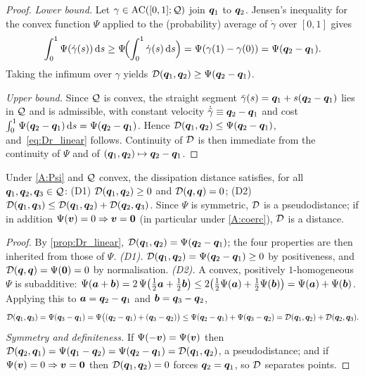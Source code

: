 \begin{proof}
\emph{Lower bound.} Let $\gamma\in\mathrm{AC}([0,1];\mathcal{Q})$ join
$\bm{q}_1$ to $\bm{q}_2$. Jensen's inequality for the convex function
$\Psi$ applied to the (probability) average of $\dot\gamma$ over
$[0,1]$ gives
\[
  \int_0^1\Psi(\dot\gamma(s))\mathop{}\!\mathrm{d} s
  \ge\Psi\!\Bigl(\int_0^1\dot\gamma(s)\mathop{}\!\mathrm{d} s\Bigr)
  =\Psi(\gamma(1)-\gamma(0))=\Psi(\bm{q}_2-\bm{q}_1).
\]
Taking the infimum over $\gamma$ yields
$\mathcal{D}(\bm{q}_1,\bm{q}_2)\ge\Psi(\bm{q}_2-\bm{q}_1)$.

\emph{Upper bound.} Since $\mathcal{Q}$ is convex, the straight segment
$\bar\gamma(s)=\bm{q}_1+s(\bm{q}_2-\bm{q}_1)$ lies in $\mathcal{Q}$ and is
admissible, with constant velocity $\dot{\bar\gamma}\equiv\bm{q}_2-\bm{q}_1$
and cost $\int_0^1\Psi(\bm{q}_2-\bm{q}_1)\mathop{}\!\mathrm{d} s=\Psi(\bm{q}_2-\bm{q}_1)$.
Hence $\mathcal{D}(\bm{q}_1,\bm{q}_2)\le\Psi(\bm{q}_2-\bm{q}_1)$, and~\eqref{eq:Dr_linear}
follows. Continuity of $\mathcal{D}$ is then immediate from the continuity of
$\Psi$ and of $(\bm{q}_1,\bm{q}_2)\mapsto\bm{q}_2-\bm{q}_1$.
\end{proof}

\begin{proposition}\label{prop:quasi_distance}
Under \ref{A:Psi} and $\mathcal{Q}$ convex, the dissipation distance satisfies,
for all $\bm{q}_1,\bm{q}_2,\bm{q}_3\in\mathcal{Q}$:
\textnormal{(D1)} $\mathcal{D}(\bm{q}_1,\bm{q}_2)\ge0$ and $\mathcal{D}(\bm{q},\bm{q})=0$;
\textnormal{(D2)} $\mathcal{D}(\bm{q}_1,\bm{q}_3)\le\mathcal{D}(\bm{q}_1,\bm{q}_2)+\mathcal{D}(\bm{q}_2,\bm{q}_3)$.
Since $\Psi$ is symmetric, $\mathcal{D}$ is a pseudodistance; if in addition
$\Psi(\bm{v})=0\Rightarrow\bm{v}=\bm{0}$ (in particular under
\ref{A:coerc}), $\mathcal{D}$ is a distance.
\end{proposition}

\begin{proof}
By \cref{prop:Dr_linear}, $\mathcal{D}(\bm{q}_1,\bm{q}_2)=\Psi(\bm{q}_2-\bm{q}_1)$;
the four properties are then inherited from those of $\Psi$.
\emph{(D1).} $\mathcal{D}(\bm{q}_1,\bm{q}_2)=\Psi(\bm{q}_2-\bm{q}_1)\ge0$ by
positiveness, and $\mathcal{D}(\bm{q},\bm{q})=\Psi(\bm{0})=0$ by normalisation.
\emph{(D2).} A convex, positively $1$-homogeneous $\Psi$ is subadditive:
$\Psi(\bm{a}+\bm{b})=2\,\Psi\bigl(\tfrac12\bm{a}+\tfrac12\bm{b}\bigr)
\le2\bigl(\tfrac12\Psi(\bm{a})+\tfrac12\Psi(\bm{b})\bigr)=\Psi(\bm{a})+\Psi(\bm{b})$.
Applying this to $\bm{a}=\bm{q}_2-\bm{q}_1$ and $\bm{b}=\bm{q}_3-\bm{q}_2$,
\[
  \mathcal{D}(\bm{q}_1,\bm{q}_3)=\Psi(\bm{q}_3-\bm{q}_1)
  =\Psi\bigl((\bm{q}_2-\bm{q}_1)+(\bm{q}_3-\bm{q}_2)\bigr)
  \le\Psi(\bm{q}_2-\bm{q}_1)+\Psi(\bm{q}_3-\bm{q}_2)
  =\mathcal{D}(\bm{q}_1,\bm{q}_2)+\mathcal{D}(\bm{q}_2,\bm{q}_3).
\]
\emph{Symmetry and definiteness.} If $\Psi(-\bm{v})=\Psi(\bm{v})$ then
$\mathcal{D}(\bm{q}_2,\bm{q}_1)=\Psi(\bm{q}_1-\bm{q}_2)=\Psi(\bm{q}_2-\bm{q}_1)=\mathcal{D}(\bm{q}_1,\bm{q}_2)$,
a pseudodistance; and if $\Psi(\bm{v})=0\Rightarrow\bm{v}=\bm{0}$ then
$\mathcal{D}(\bm{q}_1,\bm{q}_2)=0$ forces $\bm{q}_2=\bm{q}_1$, so $\mathcal{D}$ separates
points.
\end{proof}

